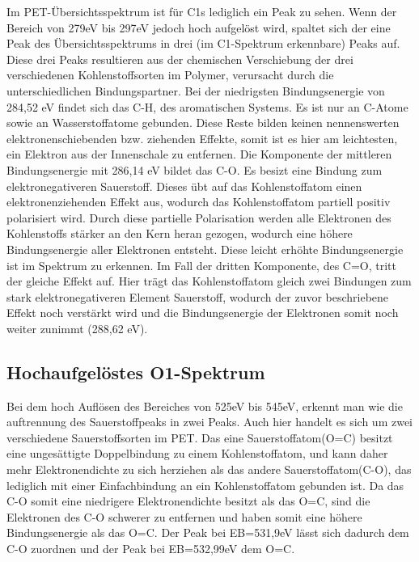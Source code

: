 \documentclass{article}
\begin{document}
Im PET-Übersichtsspektrum ist für C1s lediglich ein Peak zu sehen. Wenn der
Bereich von 279eV bis 297eV jedoch hoch aufgelöst wird, spaltet sich der eine
Peak des Übersichtsspektrums in drei (im C1-Spektrum erkennbare) Peaks auf.
Diese drei Peaks resultieren aus der chemischen Verschiebung der drei
verschiedenen Kohlenstoffsorten im Polymer, verursacht durch die
unterschiedlichen Bindungspartner. Bei der niedrigsten Bindungsenergie von
284,52 eV findet sich das C-H, des aromatischen Systems. Es ist nur an C-Atome
sowie an Wasserstoffatome gebunden. Diese Reste bilden keinen nennenswerten
elektronenschiebenden bzw. ziehenden Effekte, somit ist es hier am leichtesten,
ein Elektron aus der Innenschale zu entfernen. Die Komponente der mittleren
Bindungsenergie mit 286,14 eV bildet das C-O. Es besizt eine Bindung zum
elektronegativeren Sauerstoff. Dieses übt auf das Kohlenstoffatom einen
elektronenziehenden Effekt aus, wodurch das Kohlenstoffatom partiell positiv
polarisiert wird. Durch diese partielle Polarisation werden alle Elektronen des
Kohlenstoffs stärker an den Kern heran gezogen, wodurch eine höhere
Bindungsenergie aller Elektronen entsteht. Diese leicht erhöhte Bindungsenergie
ist im Spektrum zu erkennen.  Im Fall der dritten Komponente, des C=O,  tritt
der gleiche Effekt auf. Hier trägt das Kohlenstoffatom gleich zwei Bindungen zum
stark elektronegativeren Element Sauerstoff, wodurch der zuvor beschriebene
Effekt noch verstärkt wird und die Bindungsenergie der Elektronen somit noch
weiter zunimmt (288,62 eV).

\subsection{Hochaufgelöstes O1-Spektrum}

Bei dem hoch Auflösen des Bereiches von 525eV bis 545eV, erkennt man wie die
auftrennung des Sauerstoffpeaks in zwei Peaks. Auch hier handelt es sich um zwei
verschiedene Sauerstoffsorten im PET. Das eine Sauerstoffatom(O=C) besitzt eine
ungesättigte Doppelbindung zu einem Kohlenstoffatom, und kann daher mehr
Elektronendichte zu sich herziehen als das andere Sauerstoffatom(C-O), das
lediglich mit einer Einfachbindung an ein Kohlenstoffatom gebunden ist. Da das
C-O somit eine niedrigere Elektronendichte besitzt als das O=C, sind die
Elektronen des C-O schwerer zu entfernen und haben somit eine höhere
Bindungsenergie als das O=C. Der Peak bei EB=531,9eV lässt sich dadurch dem C-O
zuordnen und der Peak bei EB=532,99eV dem O=C.
\end{document}

